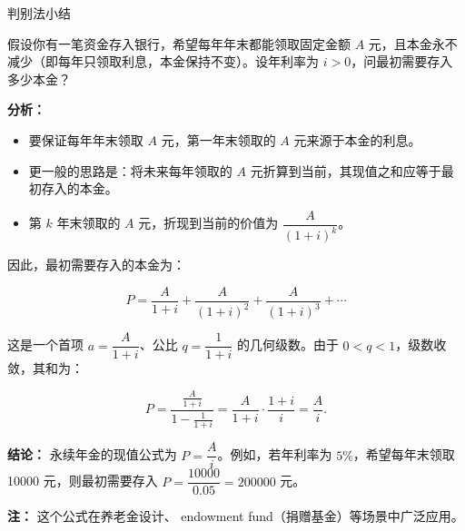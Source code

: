 \documentclass[aspectratio=169,10pt,fontset=fandol]{ctexbeamer}
\begin{document}
\begin{frame}[t,fragile]{判别法小结}
\normalsize
{\normalsize
\begin{application}



假设你有一笔资金存入银行，希望每年年末都能领取固定金额 \(A\) 元，且本金永不减少（即每年只领取利息，本金保持不变）。设年利率为 \(i>0\)，问最初需要存入多少本金？



\textbf{分析：}

\begin{itemize}

\item 要保证每年年末领取 \(A\) 元，第一年末领取的 \(A\) 元来源于本金的利息。

\item 更一般的思路是：将未来每年领取的 \(A\) 元折算到当前，其现值之和应等于最初存入的本金。

\item 第 \(k\) 年末领取的 \(A\) 元，折现到当前的价值为 \(\dfrac{A}{(1+i)^k}\)。

\end{itemize}



因此，最初需要存入的本金为：

\[

P = \frac{A}{1+i} + \frac{A}{(1+i)^2} + \frac{A}{(1+i)^3} + \cdots

\]



这是一个首项 \(a=\dfrac{A}{1+i}\)、公比 \(q=\dfrac{1}{1+i}\) 的几何级数。由于 \(0<q<1\)，级数收敛，其和为：

\[

P=\frac{\frac{A}{1+i}}{1-\frac{1}{1+i}}

=\frac{A}{1+i}\cdot\frac{1+i}{i}

=\frac{A}{i}.

\]



\textbf{结论：} 永续年金的现值公式为 \(P=\dfrac{A}{i}\)。例如，若年利率为 \(5\%\)，希望每年末领取 10000 元，则最初需要存入 \(P=\dfrac{10000}{0.05}=200000\) 元。



\textbf{注：} 这个公式在养老金设计、 endowment fund（捐赠基金）等场景中广泛应用。

\end{application}
}
\end{frame}
\end{document}
